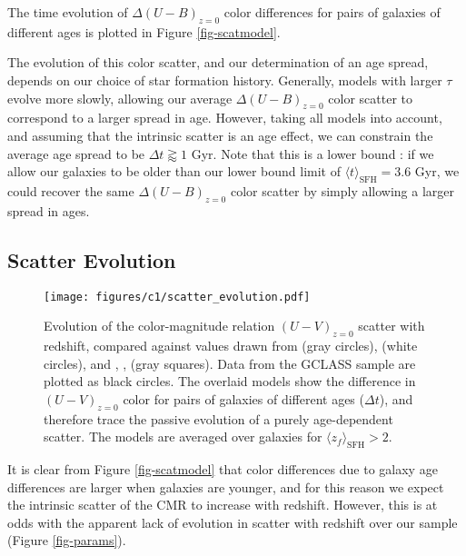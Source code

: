 The time evolution of $\Delta(U-B)_{z=0}$ color differences for pairs of galaxies of different ages is plotted in Figure \ref{fig-scatmodel}.

The evolution of this color scatter, and our determination of an age spread, depends on our choice of star formation history. Generally, models with larger $\tau$ evolve more slowly, allowing our average $\Delta(U-B)_{z=0}$ color scatter to correspond to a larger spread in age. However, taking all models into account, and assuming that the intrinsic scatter is an age effect, we can constrain the average age spread to be $\Delta t \gtrapprox 1$ Gyr. Note that this is a lower bound : if we allow our galaxies to be older than our lower bound limit of $\langle t \rangle_\mathrm{SFH} = 3.6$ Gyr,  we could recover the same $\Delta(U-B)_{z=0}$ color scatter by simply allowing a larger spread in ages. %

\subsection{Scatter Evolution}\label{sec-scatevo}

\begin{figure}
\texttt{[image: figures/c1/scatter\_evolution.pdf]}
\caption[Evolution of the color-magnitude relation scatter with redshift, with values drawn from the literature]{Evolution of the color-magnitude relation $(U-V)_{z=0}$ scatter with redshift, compared against values drawn from \citet{Snyder:2012wq} (gray circles), \citet{Hilton:2009nq} (white circles), and \citet{Papovich:2010yj}, \citet{Stanford:2012yi}, \citet{Zeimann:2012bf} (gray squares). Data from the GCLASS sample are plotted as black circles. The overlaid models show the difference in $(U-V)_{z=0}$ color for pairs of galaxies of different ages ($\Delta t$), and therefore trace the passive evolution of a purely age-dependent scatter. The models are averaged over galaxies for $\langle z_f \rangle_\mathrm{SFH} > 2$.
\label{fig-scatter_evolution}}
\end{figure}

It is clear from Figure \ref{fig-scatmodel} that color differences due to galaxy age differences are larger when galaxies are younger, and for this reason we expect the intrinsic scatter of the CMR to increase with redshift. However, this is at odds with the apparent lack of evolution in scatter with redshift over our sample (Figure \ref{fig-params}).

